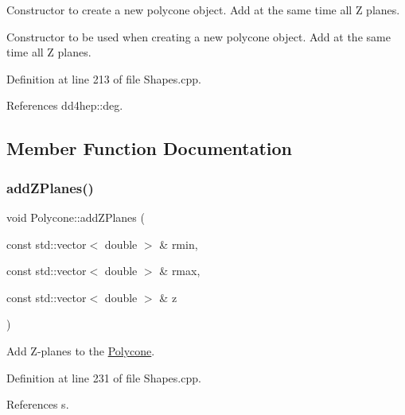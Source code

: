 Constructor to create a new polycone object. Add at the same time all Z planes. 

Constructor to be used when creating a new polycone object. Add at the same time all Z planes. 

Definition at line 213 of file Shapes.\+cpp.



References dd4hep\+::deg.



\subsection{Member Function Documentation}
\hypertarget{class_d_d4hep_1_1_geometry_1_1_polycone_a4fde5687aa1badc803871e1517a3535d}{}\label{class_d_d4hep_1_1_geometry_1_1_polycone_a4fde5687aa1badc803871e1517a3535d} 
\subsubsection{\texorpdfstring{add\+Z\+Planes()}{addZPlanes()}}
{\footnotesize\ttfamily void Polycone\+::add\+Z\+Planes (\begin{DoxyParamCaption}\item[{const std\+::vector$<$ double $>$ \&}]{rmin,  }\item[{const std\+::vector$<$ double $>$ \&}]{rmax,  }\item[{const std\+::vector$<$ double $>$ \&}]{z }\end{DoxyParamCaption})}



Add Z-\/planes to the \hyperlink{class_d_d4hep_1_1_geometry_1_1_polycone}{Polycone}. 



Definition at line 231 of file Shapes.\+cpp.



References s.

\hypertarget{class_d_d4hep_1_1_geometry_1_1_polycone_aacef9a0deaef223261d450b6c46edf6f}{}\label{class_d_d4hep_1_1_geometry_1_1_polycone_aacef9a0deaef223261d450b6c46edf6f} 

